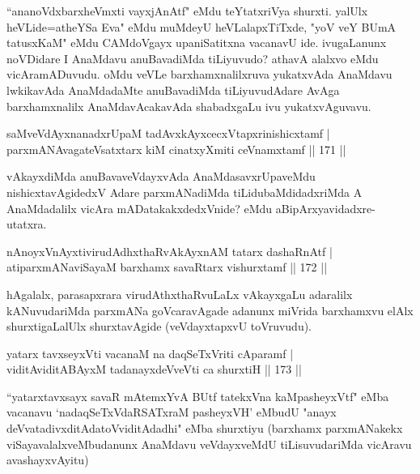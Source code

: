 \begin{artha}
``ananoVdxbarxheVmxti vayxjAnAtf" eMdu teYtatxriVya shurxti. yalUlx heVLide=atheYSa Eva" eMdu muMdeyU heVLalapxTiTxde, "yoV veY BUmA tatusxKaM" eMdu CAMdoVgayx upaniSatitxna vacanavU ide. ivugaLanunx noVDidare I AnaMdavu anuBavadiMda tiLiyuvudo? athavA alalxvo eMdu vicAramADuvudu. oMdu veVLe barxhamxnalilxruva yukatxvAda AnaMdavu lwkikavAda AnaMdadaMte anuBavadiMda tiLiyuvudAdare AvAga barxhamxnalilx AnaMdavAcakavAda shabadxgaLu ivu yukatxvAguvavu.
\end{artha}


\begin{shl}
saMveVdAyxnanadxrUpaM tadAvxkAyxcecxVtapxrinishicxtamf |\\
parxmANAvagateVsatxtarx kiM cinatxyXmiti ceVnamxtamf \hfill || 171 ||
\end{shl}

\begin{artha}
vAkayxdiMda anuBavaveVdayxvAda AnaMdasavxrUpaveMdu nishicxtavAgidedxV Adare parxmANadiMda tiLidubaMdidadxriMda A AnaMdadalilx vicAra mADatakakxdedxVnide? eMdu aBipArxyavidadxre- utatxra.
\end{artha}%

\begin{shl}
nAnoyxVnAyxtivirudAdhxthaRvAkAyxnAM tatarx dashaRnAtf |\\
atiparxmANaviSayaM barxhamx savaRtarx vishurxtamf \hfill || 172 ||
\end{shl}

\begin{artha}
hAgalalx, parasapxrara virudAthxthaRvuLaLx vAkayxgaLu adaralilx kANuvudariMda parxmANa goVcaravAgade adanunx miVrida barxhamxvu elAlx shurxtigaLalUlx shurxtavAgide (veVdayxtapxvU toVruvudu).
\end{artha}

\begin{shl}
yatarx tavxseyxVti vacanaM na daqSeTxVriti cAparamf |\\
viditAviditABAyxM tadanayxdeVveVti ca shurxtiH \hfill || 173 ||
\end{shl}

\begin{artha}
``yatarxtavxsayx savaR mAtemxYvA BUtf tatekxVna kaMpasheyxVtf" eMba vacanavu `nadaqSeTxVdaRSATxraM pasheyxVH' eMbudU "anayx deVvatadivxditAdatoV\s viditAdadhi" eMba shurxtiyu (barxhamx parxmANakekx viSayavalalxveMbudanunx AnaMdavu veVdayxveMdU tiLisuvudariMda vicAravu avashayxvAyitu)
\end{artha}

